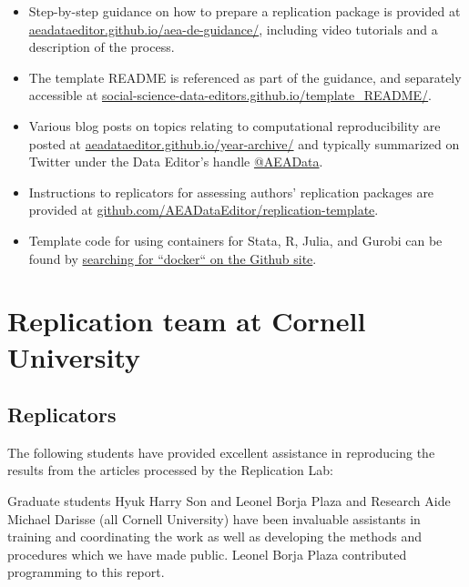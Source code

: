 \documentclass[PP]{AEA}
\begin{document}
\begin{itemize}
    \item Step-by-step guidance on how to prepare a replication package is provided at \href{https://aeadataeditor.github.io/aea-de-guidance/}{aeadataeditor.github.io/aea-de-guidance/}, including video tutorials and a description of the process. 
    \item The template README \citep{READMEv1.0.0} is referenced as part of the guidance, and separately accessible at \href{https://social-science-data-editors.github.io/template_README/}{social-science-data-editors.github.io/template\_README/}.
    \item Various blog posts on topics relating to computational reproducibility are posted at \href{https://aeadataeditor.github.io/year-archive/}{aeadataeditor.github.io/year-archive/} and typically summarized on Twitter under the Data Editor's handle \href{https://twitter.com/AEAData}{@AEAData}.
    \item Instructions to replicators for assessing authors' replication packages are provided at \href{https://github.com/AEADataEditor/replication-template}{github.com/AEADataEditor/replication-template}.
    \item Template code for using containers for Stata, R, Julia, and Gurobi can be found by \href{https://github.com/AEADataEditor?q=docker&type=all&language=&sort=}{searching for ``docker`` on the Github site}.
    
\end{itemize}


\section{Replication team at Cornell University}

\subsection{Replicators} 
\label{app:replicators}

The following \textbf{\teamsize} students have provided excellent assistance in reproducing the results from the \jiramcs{} articles processed by the Replication Lab:
%
%
%



Graduate students Hyuk Harry Son and Leonel Borja Plaza  and Research Aide Michael Darisse (all Cornell University) have been invaluable assistants in training and coordinating the work as well as developing the methods and procedures which we have made public. Leonel Borja Plaza contributed programming to this report. 
\end{document}
